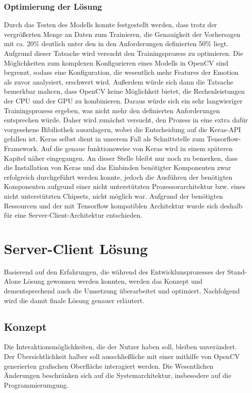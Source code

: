 \documentclass[12pt, a4paper]{report}
\begin{document}
\subsection{Optimierung der Lösung}
Durch das Testen des Modells konnte festgestellt werden, dass trotz der vergrößerten Menge an Daten zum Trainieren, die Genauigkeit der Vorhersagen mit ca. 20\% deutlich unter den in den Anforderungen definierten 50\% liegt. Aufgrund dieser Tatsache wird versucht den Trainingsprozess zu optimieren. Die Möglichkeiten zum komplexen Konfigurieren eines Modells in OpenCV sind begrenzt, sodass eine Konfiguration, die wesentlich mehr Features der Emotion als zuvor analysiert, erschwert wird. Außerdem würde sich dann die Tatsache bemerkbar mahcen, dass OpenCV keine Möglichkeit bietet, die  Rechenleistungen der CPU und der GPU zu kombinieren. Daraus würde sich ein sehr langwieriger Trainingsprozess ergeben, was nicht mehr den definierten Anforderungen entsprechen würde. Daher wird zunächst versucht, den Prozess in eine extra dafür vorgesehene Bibiliothek auszulagern, wobei die Entscheidung auf die Keras-API gefallen ist. Keras selbst dient in unserem Fall als Schnittstelle zum Tensorflow-Framework. Auf die genaue funktionsweise von Keras wird in einem späteren Kapitel näher eingegangen. An dieser Stelle bleibt nur noch zu bemerken, dass die Installation von Keras und das Einbinden benötigter Komponenten zwar erfolgreich durchgeführt werden konnte, jedoch die Ausführen der benötigten Komponenten aufgrund einer nicht unterstützten Prozessorarchitektur bzw. eines nicht unterstützten Chipsets, nicht möglich war. Aufgrund der benötigten Ressourcen und der mit Tensorflow kompatiblen Architektur wurde sich deshalb für eine Server-Client-Architektur entschieden.

\chapter{Server-Client Lösung}
Basierend auf den Erfahrungen, die während des Entwicklunsprozesses der Stand-Alone Lösung gewonnen werden konnten, werden das Konzept und dementsprechend auch die Umsetzung überarbeitet und optimiert. Nachfolgend wird die damit finale Lösung genauer erläutert.

\section{Konzept}
Die Interaktionsmöglichkeiten, die der Nutzer haben soll, bleiben unverändert. Der Übersichtlichkeit halber soll ausschließliche mit einer mithilfe von OpenCV generierten grafischen Oberfläche interagiert werden. Die Wesentlichen Änderungen beschränken sich auf die Systemarchitektur, insbesodere auf die Programmierumgung.
\end{document}
